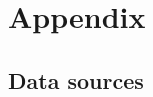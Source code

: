 \documentclass{article}\usepackage[]{graphicx}\usepackage[]{xcolor}
\begin{document}

\newpage

\appendix

\section*{Appendix}
\captionsetup{labelformat=AppendixTables}
\setcounter{table}{0}

\subsection*{Data sources}




\begin{enumerate}


\end{enumerate}
\end{document}
